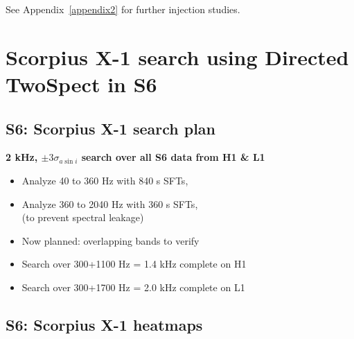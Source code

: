 See Appendix~\ref{appendix2} for further injection studies.




        \section{Scorpius X-1 search using Directed TwoSpect in S6}
        \label{directed_results}
 




\subsection{S6: Scorpius X-1 search plan}

\textbf{2 kHz, $\pm 3 \sigma_{a \sin i}$ search over all S6 data from H1 \& L1}
\begin{itemize}
\item Analyze 40 to 360 Hz with 840 s SFTs,
\item Analyze 360 to 2040 Hz with 360 s SFTs,\\
(to prevent spectral leakage)
\item Now planned: overlapping bands to verify
\item Search over 300+1100 Hz = 1.4 kHz complete on H1
\item Search over 300+1700 Hz = 2.0 kHz complete on L1
\end{itemize}


\subsection{S6: Scorpius X-1 heatmaps}

